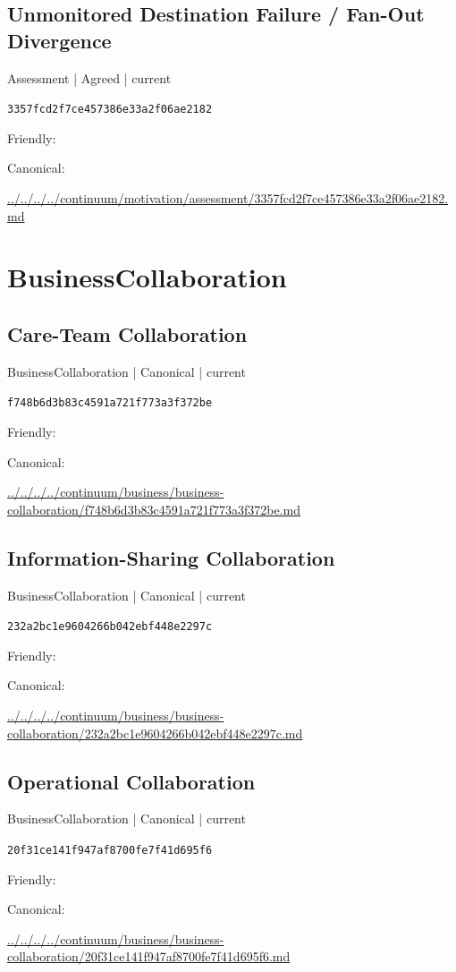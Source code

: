 \documentclass[10pt,a4paper]{article}
\begin{document}
\subsection*{Unmonitored Destination Failure / Fan-Out Divergence}
{\small Assessment | Agreed | current}\par
\texttt{3357fcd2f7ce457386e33a2f06ae2182}\par
Friendly: \par
Canonical: \par
{\footnotesize\url{../../../../continuum/motivation/assessment/3357fcd2f7ce457386e33a2f06ae2182.md}}\par
\section*{BusinessCollaboration}
\subsection*{Care-Team Collaboration}
{\small BusinessCollaboration | Canonical | current}\par
\texttt{f748b6d3b83c4591a721f773a3f372be}\par
Friendly: \par
Canonical: \par
{\footnotesize\url{../../../../continuum/business/business-collaboration/f748b6d3b83c4591a721f773a3f372be.md}}\par
\subsection*{Information-Sharing Collaboration}
{\small BusinessCollaboration | Canonical | current}\par
\texttt{232a2bc1e9604266b042ebf448e2297c}\par
Friendly: \par
Canonical: \par
{\footnotesize\url{../../../../continuum/business/business-collaboration/232a2bc1e9604266b042ebf448e2297c.md}}\par
\subsection*{Operational Collaboration}
{\small BusinessCollaboration | Canonical | current}\par
\texttt{20f31ce141f947af8700fe7f41d695f6}\par
Friendly: \par
Canonical: \par
{\footnotesize\url{../../../../continuum/business/business-collaboration/20f31ce141f947af8700fe7f41d695f6.md}}\par
\end{document}
